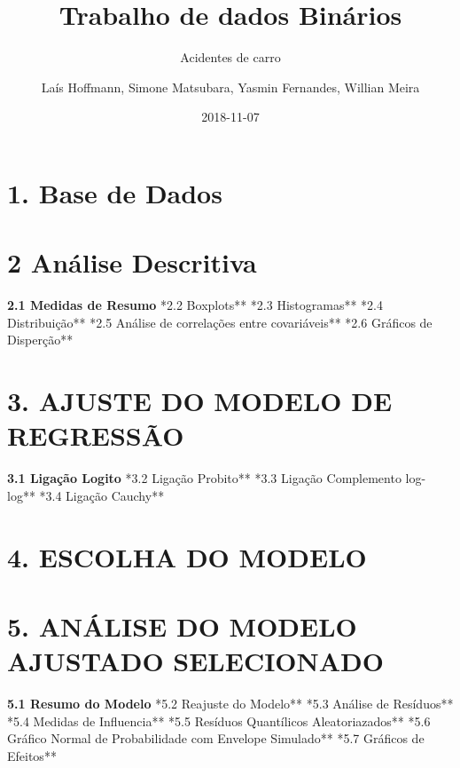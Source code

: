 \documentclass[]{article}
\title{Trabalho de dados Binários}
\subtitle{Acidentes de carro}
\author{Laís Hoffmann, Simone Matsubara, Yasmin Fernandes, Willian Meira}
\date{2018-11-07}
\begin{document}
\maketitle

\section{1. Base de Dados}\label{base-de-dados}

\section{2 Análise Descritiva}\label{analise-descritiva}

\textbf{2.1 Medidas de Resumo} \newline **2.2 Boxplots** \newline **2.3
Histogramas** \newline **2.4 Distribuição** \newline **2.5 Análise de
correlações entre covariáveis** \newline **2.6 Gráficos de Disperção**

\section{3. AJUSTE DO MODELO DE
REGRESSÃO}\label{ajuste-do-modelo-de-regressao}

\textbf{3.1 Ligação Logito} \newline **3.2 Ligação Probito**
\newline **3.3 Ligação Complemento log-log** \newline **3.4 Ligação
Cauchy**

\section{4. ESCOLHA DO MODELO}\label{escolha-do-modelo}

\section{5. ANÁLISE DO MODELO AJUSTADO
SELECIONADO}\label{analise-do-modelo-ajustado-selecionado}

\textbf{5.1 Resumo do Modelo} \newline **5.2 Reajuste do Modelo**
\newline **5.3 Análise de Resíduos** \newline **5.4 Medidas de
Influencia** \newline **5.5 Resíduos Quantílicos Aleatoriazados**
\newline **5.6 Gráfico Normal de Probabilidade com Envelope Simulado**
\newline **5.7 Gráficos de Efeitos**
\end{document}
